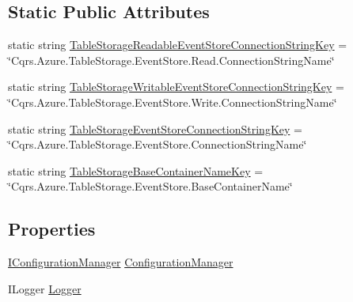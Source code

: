 \subsection*{Static Public Attributes}
\begin{DoxyCompactItemize}
\item 
static string \hyperlink{classCqrs_1_1Azure_1_1BlobStorage_1_1Events_1_1TableStorageEventStoreConnectionStringFactory_ac28aea2439fe0bed85d1b53c0fd8fdaf}{Table\+Storage\+Readable\+Event\+Store\+Connection\+String\+Key} = \char`\"{}Cqrs.\+Azure.\+Table\+Storage.\+Event\+Store.\+Read.\+Connection\+String\+Name\char`\"{}
\item 
static string \hyperlink{classCqrs_1_1Azure_1_1BlobStorage_1_1Events_1_1TableStorageEventStoreConnectionStringFactory_a73df7618d5978a2c0d2e69880b799369}{Table\+Storage\+Writable\+Event\+Store\+Connection\+String\+Key} = \char`\"{}Cqrs.\+Azure.\+Table\+Storage.\+Event\+Store.\+Write.\+Connection\+String\+Name\char`\"{}
\item 
static string \hyperlink{classCqrs_1_1Azure_1_1BlobStorage_1_1Events_1_1TableStorageEventStoreConnectionStringFactory_a95f8662029c8a40117e326973de936bf}{Table\+Storage\+Event\+Store\+Connection\+String\+Key} = \char`\"{}Cqrs.\+Azure.\+Table\+Storage.\+Event\+Store.\+Connection\+String\+Name\char`\"{}
\item 
static string \hyperlink{classCqrs_1_1Azure_1_1BlobStorage_1_1Events_1_1TableStorageEventStoreConnectionStringFactory_a9aad5e7497e3f5192d3aaec8d5f7b5f8}{Table\+Storage\+Base\+Container\+Name\+Key} = \char`\"{}Cqrs.\+Azure.\+Table\+Storage.\+Event\+Store.\+Base\+Container\+Name\char`\"{}
\end{DoxyCompactItemize}
\subsection*{Properties}
\begin{DoxyCompactItemize}
\item 
\hyperlink{interfaceCqrs_1_1Configuration_1_1IConfigurationManager}{I\+Configuration\+Manager} \hyperlink{classCqrs_1_1Azure_1_1BlobStorage_1_1Events_1_1TableStorageEventStoreConnectionStringFactory_a3787d14bf40a1756c742b0640413a62e}{Configuration\+Manager}
\item 
I\+Logger \hyperlink{classCqrs_1_1Azure_1_1BlobStorage_1_1Events_1_1TableStorageEventStoreConnectionStringFactory_a1324be985c77f1393a45a73dbb178314}{Logger}
\end{DoxyCompactItemize}


